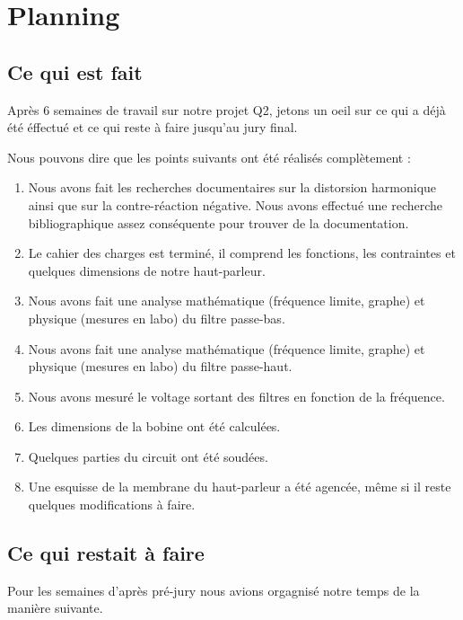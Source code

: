 

\section{Planning}

\subsection{Ce qui est fait}
Après 6 semaines de travail sur notre projet Q2, jetons un oeil sur ce qui a déjà été éffectué et ce qui reste à faire jusqu'au jury final.

Nous pouvons dire que les points suivants ont été réalisés complètement :

\begin{enumerate}
	\item Nous avons fait les recherches documentaires sur la distorsion harmonique ainsi que sur la contre-réaction négative.
	Nous avons effectué une recherche bibliographique assez conséquente pour trouver de la documentation.
	\item Le cahier des charges est terminé, il comprend les fonctions, les contraintes et quelques dimensions de notre haut-parleur.
	\item Nous avons fait une analyse mathématique (fréquence limite, graphe) et physique (mesures en labo) du filtre passe-bas. 
	\item Nous avons fait une analyse mathématique (fréquence limite, graphe) et physique (mesures en labo) du filtre passe-haut.
	\item Nous avons mesuré le voltage sortant des filtres en fonction de la fréquence.
	\item Les dimensions de la bobine ont été calculées.
	\item Quelques parties du circuit ont été soudées.
	\item Une esquisse de la membrane du haut-parleur a été agencée, même si il reste quelques modifications à faire.
\end{enumerate}

\subsection{Ce qui restait à faire}

Pour les semaines d'après pré-jury nous avions orgagnisé notre temps de la manière suivante.


